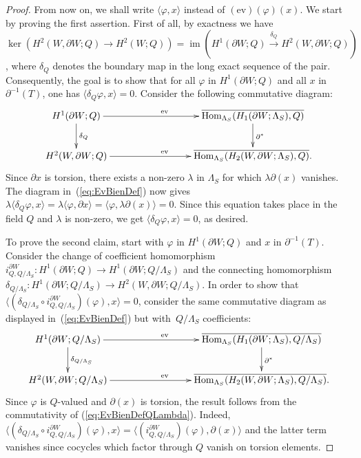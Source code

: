 \documentclass[11pt,a4paper]{amsart}
\theoremstyle{definition}
\newcommand{\im}{\operatorname{im}}
\def\op{\operatorname}
\begin{document}
\begin{proof}
From now on, we shall write $\langle \varphi,x \rangle$ instead of $(\text{ev})(\varphi)(x)$. We start by proving the first assertion. First of all, by exactness we have $\ker(H^2(W,\partial W;Q) \to H^2(W;Q))=\im(H^1(\partial W;Q) \stackrel{\delta_Q}{\to} H^2(W,\partial W;Q))$, where $\delta_Q$ denotes the boundary map in the long exact sequence of the pair. Consequently, the goal is to show that for all $\varphi$ in $H^1(\partial W;Q)$ and all $x$ in $\partial^{-1}(T)$, one has $\langle \delta_Q \varphi,x \rangle=0$. Consider the following commutative diagram:
\begin{equation}
\label{eq:EvBienDef}
\xymatrix{
H^1(\partial W;Q) \ar[d]^{\delta_Q} \ar[rrr]^{\text{ev}} &&& \overline{\op{Hom}_{\Lambda_S}(H_1(\partial W;\Lambda_S),Q)} \ar[d]^{\partial^*} \\
H^2(W,\partial W;Q) \ar[rrr]^{\text{ev}}&&& \overline{\op{Hom}_{\Lambda_S}(H_2(W,\partial W;\Lambda_S),Q)}.}
\end{equation}
Since $\partial x$ is torsion, there exists a non-zero $\lambda$ in $\Lambda_S$ for which $\lambda \partial (x)$ vanishes. The diagram in~(\ref{eq:EvBienDef}) now gives $\lambda \langle \delta_Q \varphi,x \rangle=\lambda \langle \varphi,\partial x \rangle =\langle \varphi,\lambda \partial (x) \rangle =0$. Since this equation takes place in the field $Q$ and $\lambda$ is non-zero, we get $\langle  \delta_Q \varphi,x \rangle=0$, as desired.

To prove the second claim, start with $\varphi$ in $H^1(\partial W;Q)$ and $x$ in $\partial^{-1}(T)$. Consider the change of coefficient homomorphism $i_{Q,Q/\Lambda_S}^{\partial W} \colon H^1(\partial W;Q) \to H^1(\partial W;Q/\Lambda_S)$ and the connecting  homomorphism $\delta_{Q/\Lambda_S} \colon H^1(\partial W;Q/ \Lambda_S) \to H^2(W,\partial W;Q/\Lambda_S)$. In order to show that $\langle (\delta_{Q/\Lambda_S} \circ i_{Q,Q/\Lambda_S}^{\partial W})(\varphi), x \rangle=0$, consider the same commutative diagram as displayed in~(\ref{eq:EvBienDef}) but with~$Q/\Lambda_S$ coefficients:
\begin{equation}
\label{eq:EvBienDefQLambda}
\xymatrix{
H^1(\partial W;Q/\Lambda_S) \ar[d]^{\delta_{Q/\Lambda_S}} \ar[rrr]^{\text{ev}} &&& \overline{\op{Hom}_{\Lambda_S}(H_1(\partial W;\Lambda_S),Q/\Lambda_S)} \ar[d]^{\partial^*} \\
H^2(W,\partial W;Q/\Lambda_S) \ar[rrr]^{\text{ev}}&&& \overline{\op{Hom}_{\Lambda_S}(H_2(W,\partial W;\Lambda_S),Q/\Lambda_S)}.}
\end{equation}
 Since $\varphi$ is $Q$-valued and $\partial(x)$ is torsion, the result follows from the commutativity of (\ref{eq:EvBienDefQLambda}). Indeed, $\langle (\delta_{Q/\Lambda_S} \circ i_{Q,Q/\Lambda_S}^{\partial W})(\varphi), x \rangle=\langle (i_{Q,Q/\Lambda_S}^{\partial W})(\varphi), \partial(x) \rangle$ and the latter term vanishes since cocycles which factor through $Q$ vanish on torsion elements.
\end{proof}
\end{document}
